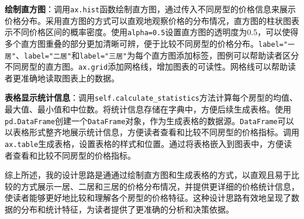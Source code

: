 \documentclass[lang=cn,11pt,a4paper]{elegantpaper}
\begin{document}
\textbf{绘制直方图}：调用\lstinline{ax.hist}函数绘制直方图，通过传入不同房型的价格信息来展示价格分布。采用直方图的方式可以直观地观察价格的分布情况，直方图的柱状图表示不同价格区间的概率密度。使用\lstinline{alpha=0.5}设置直方图的透明度为0.5，可以使得多个直方图重叠的部分更加清晰可辨，便于比较不同房型的价格分布。\lstinline{label="一居"}、\lstinline{label="二居"}和\lstinline{label="三居"}为每个直方图添加标签，图例可以帮助读者区分不同房型的直方图。\lstinline{ax.grid}添加网格线，增加图表的可读性。网格线可以帮助读者更准确地读取图表上的数据。

\textbf{表格显示统计信息}：调用\lstinline{self.calculate_statistics}方法计算每个房型的均值、最大值、最小值和中位数。将统计信息存储在字典中，方便后续生成表格。使用\lstinline{pd.DataFrame}创建一个\lstinline{DataFrame}对象，作为生成表格的数据源。\lstinline{DataFrame}可以以表格形式整齐地展示统计信息，方便读者查看和比较不同房型的价格指标。调用\lstinline{ax.table}生成表格，设置表格的样式和位置。通过将表格嵌入到图表中，方便读者查看和比较不同房型的价格指标。

综上所述，我的设计思路是通通过绘制直方图和生成表格的方式，以直观且易于比较的方式展示一居、二居和三居的价格分布情况，并提供更详细的价格统计信息，使读者能够更好地比较和理解各个房型的价格特征。这种设计思路有效地呈现了数据的分布和统计特征，为读者提供了更准确的分析和决策依据。
\end{document}
